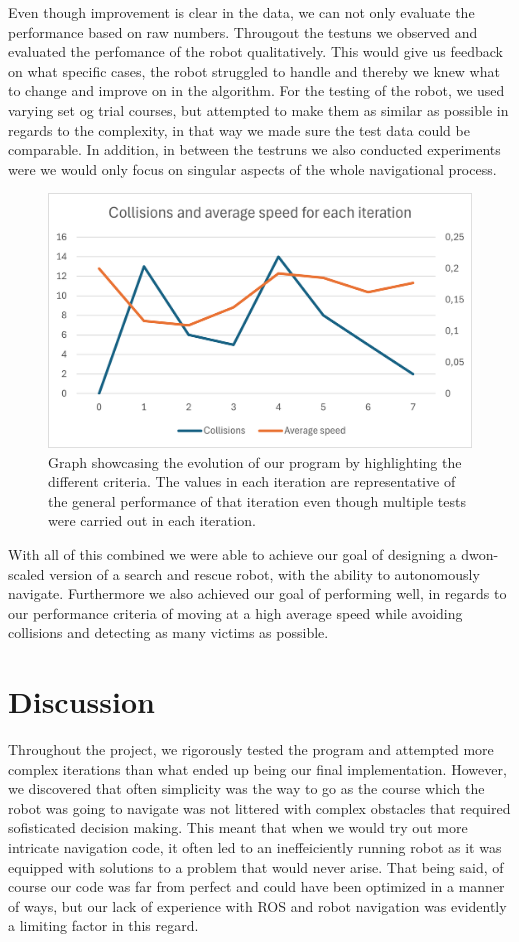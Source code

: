 \documentclass[conference]{IEEEtran}
\begin{document}
Even though improvement is clear in the data, we can not only evaluate the performance based on raw numbers. 
Througout the testuns we observed and evaluated the perfomance of the robot qualitatively.
This would give us feedback on what specific cases, the robot struggled to handle and thereby we knew what to change and improve on in the algorithm.
For the testing of the robot, we used varying set og trial courses, but attempted to make them as similar as possible in regards to the complexity, in that way we made sure the test data could be comparable.
In addition, in between the testruns we also conducted experiments were we would only focus on singular aspects of the whole navigational process.
\begin{figure}[htbp]
    \centerline{\includegraphics[width=0.9\columnwidth]{Pictures/Graph.png}}
    \caption{Graph showcasing the evolution of our program by highlighting the different criteria. The values in each iteration are representative of the general performance of that iteration even though multiple tests were carried out in each iteration.}
    \label{sec:graph}
    \end{figure}

With all of this combined we were able to achieve our goal of designing a dwon-scaled version of a search and rescue robot, with the ability to autonomously navigate.
Furthermore we also achieved our goal of performing well, in regards to our performance criteria of moving at a high average speed while avoiding collisions and detecting as many victims as possible.

\section{Discussion}
Throughout the project, we rigorously tested the program and attempted more complex iterations than what ended up being our final implementation.
However, we discovered that often simplicity was the way to go as the course which the robot was going to navigate was not littered with complex obstacles that required sofisticated decision making.
This meant that when we would try out more intricate navigation code, it often led to an ineffeiciently running robot as it was equipped with solutions to a problem that would never arise.
That being said, of course our code was far from perfect and could have been optimized in a manner of ways, but our lack of experience with ROS and robot navigation was evidently a limiting factor in this regard.
\end{document}
